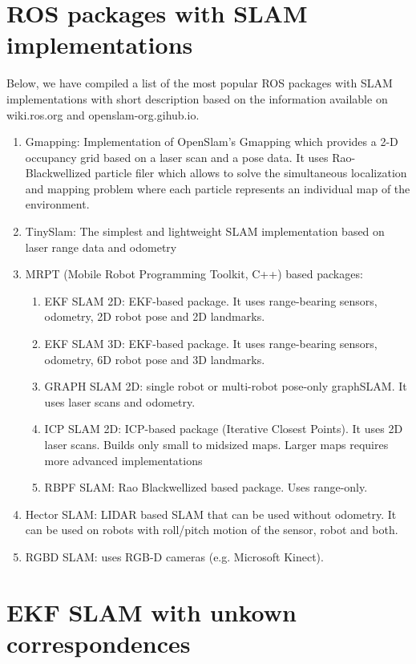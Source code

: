 \documentclass[twoside]{article}
\begin{document}
\section{ROS packages with SLAM implementations}
Below, we have compiled a list of the most popular ROS packages with SLAM implementations with short description based on the information available on wiki.ros.org and openslam-org.gihub.io.
\begin{enumerate}
    \item Gmapping: Implementation of OpenSlam's Gmapping which provides a 2-D occupancy grid based on a laser scan and a pose data. It uses Rao-Blackwellized particle filer which allows to solve the simultaneous localization and mapping problem where each particle represents an individual map of the environment.
    \item TinySlam: The simplest and lightweight SLAM implementation based on laser range data and odometry
    \item MRPT (Mobile Robot Programming Toolkit, C++) based packages:
    \begin{enumerate}
        \item EKF SLAM 2D: EKF-based package. It uses range-bearing sensors, odometry, 2D robot pose and 2D landmarks.
        \item EKF SLAM 3D: EKF-based package. It uses range-bearing sensors, odometry, 6D robot pose and 3D landmarks.
        \item GRAPH SLAM 2D: single robot or multi-robot pose-only graphSLAM. It uses laser scans and odometry.
        \item ICP SLAM 2D: ICP-based package (Iterative Closest Points). It uses 2D laser scans. Builds only small to midsized maps. Larger maps requires more advanced implementations
        \item RBPF SLAM: Rao Blackwellized based package. Uses range-only.
    \end{enumerate}
    \item Hector SLAM: LIDAR based SLAM that can be used without odometry. It can be used on robots with roll/pitch motion of the sensor, robot and both.
    \item RGBD SLAM: uses RGB-D cameras (e.g. Microsoft Kinect).
\end{enumerate}

\section {EKF SLAM with unkown correspondences}
\end{document}
